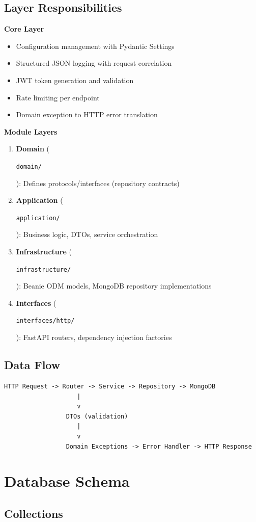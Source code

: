 \documentclass[11pt,a4paper]{article}
\newcommand{\code}[1]{\colorbox{codebg}{\strut\texttt{\small #1}}}
\begin{document}
\subsection{Layer Responsibilities}

\textbf{Core Layer}
\begin{itemize}[leftmargin=*,itemsep=1pt]
  \item Configuration management with Pydantic Settings
  \item Structured JSON logging with request correlation
  \item JWT token generation and validation
  \item Rate limiting per endpoint
  \item Domain exception to HTTP error translation
\end{itemize}

\textbf{Module Layers}
\begin{enumerate}[leftmargin=*,itemsep=1pt]
  \item \textbf{Domain} (\code{domain/}): Defines protocols/interfaces (repository contracts)
  \item \textbf{Application} (\code{application/}): Business logic, DTOs, service orchestration
  \item \textbf{Infrastructure} (\code{infrastructure/}): Beanie ODM models, MongoDB repository implementations
  \item \textbf{Interfaces} (\code{interfaces/http/}): FastAPI routers, dependency injection factories
\end{enumerate}

\subsection{Data Flow}

\begin{lstlisting}
HTTP Request -> Router -> Service -> Repository -> MongoDB
                    |
                    v
                 DTOs (validation)
                    |
                    v
                 Domain Exceptions -> Error Handler -> HTTP Response
\end{lstlisting}

\section{Database Schema}

\subsection{Collections}
\end{document}

